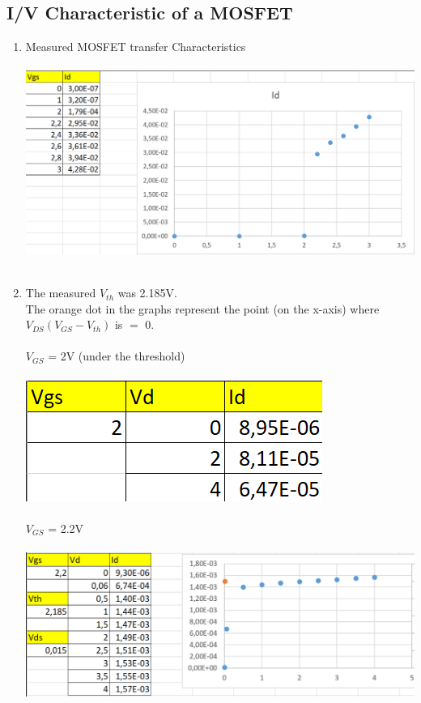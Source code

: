 \documentclass{article}
\begin{document}
		\subsection{ I/V Characteristic of a MOSFET}
			\begin{enumerate}
				\item Measured MOSFET transfer Characteristics\\\\
				\includegraphics[scale=0.45]{graph 1}\\\\
				\item The measured \(V_{th}\) was 2.185V.\\
				The orange dot in the graphs represent the point (on the x-axis) where \(V_{DS} (V_{GS}-V_{th})\) is \(=\) 0.\\\\
				\(V_{GS} \) = 2V (under the threshold)\\\\
				\includegraphics[scale=0.5]{graph 2}\\\\
				\(V_{GS} \) = 2.2V\\\\
				\includegraphics[scale=0.5]{graph 3}\pagebreak\\

\end{enumerate}
\end{document}
